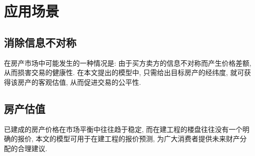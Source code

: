 \section{应用场景}
\subsection{消除信息不对称}
在房产市场中可能发生的一种情况是: 由于买方卖方的信息不对称而产生价格差额, 从而损害交易的健康性.
在本文提出的模型中, 只需给出目标房产的经纬度, 就可获得该房产的客观估值, 从而促进交易的公平性.

\subsection{房产估值}
已建成的房产价格在市场平衡中往往趋于稳定, 而在建工程的楼盘往往没有一个明确的报价, 本文的模型可用于在建工程的报价预测, 为广大消费者提供未来财产分配的合理建议.

